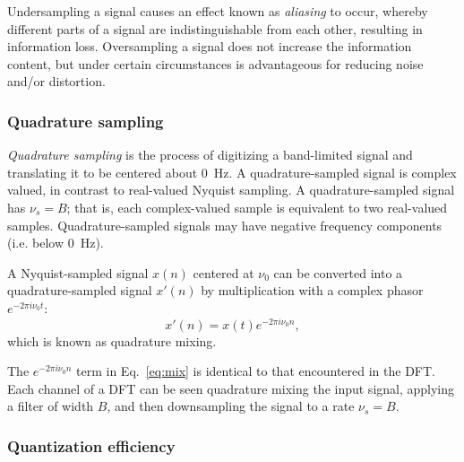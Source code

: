 \documentclass{ws-rv961x669}
\begin{document}
Undersampling a signal causes an effect known as \emph{aliasing} to occur, whereby different parts of a signal are indistinguishable from each other, resulting in information loss. Oversampling a signal does not increase the information content, but under certain circumstances is advantageous for reducing noise and/or distortion.


\subsubsection{Quadrature sampling}

\emph{Quadrature sampling}\cite{Lyons:2000uy} is the process of digitizing a band-limited signal and translating it to be centered about 0~Hz. A quadrature-sampled signal is complex valued, in contrast to real-valued Nyquist sampling. A quadrature-sampled signal has $\nu_{s} = B$; that is, each complex-valued sample is equivalent to two real-valued samples. Quadrature-sampled signals may have negative frequency components (i.e. below 0~Hz).

A Nyquist-sampled signal $x(n)$ centered at $\nu_0$ can be converted into a quadrature-sampled signal $x'(n)$ by multiplication with a complex phasor $e^{-2\pi i \nu_0 t}$:
\begin{equation}
	x'(n) = x(t) e^{-2 \pi i \nu_0 n},\label{eq:mix}
\end{equation}
which is known as quadrature mixing.

The $e^{-2\pi i \nu_0 n}$ term in Eq.~\ref{eq:mix} is identical to that encountered in the DFT. Each channel of a DFT can be seen quadrature mixing the input signal, applying a filter of width $B$, and then downsampling the signal to a rate $\nu_s=B$.


\subsubsection{Quantization efficiency \label{sub:quant}}
\end{document}
